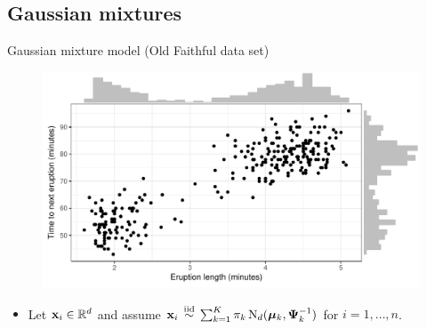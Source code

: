 \subsection{Gaussian mixtures}

\begin{frame}{Gaussian mixture model (Old Faithful data set)}
  \vspace{-15pt}
  \begin{figure}
    \centering
    \includegraphics[scale=0.65]{figure/faithful_scatter}
  \end{figure}
  \vspace{-13pt}
  \begin{itemize}
    \item Let ${\mathbf x}_i \in \mathbb{R}^d$ and assume ${\mathbf x}_i \,\overset{\text{iid}}{\sim}\, \sum_{k=1}^K \pi_{k} \operatorname{N}_d({\bm\mu}_k,{\bm\Psi}_k^{-1})$ for $i=1,\dots,n$.
  \end{itemize}
\end{frame}

